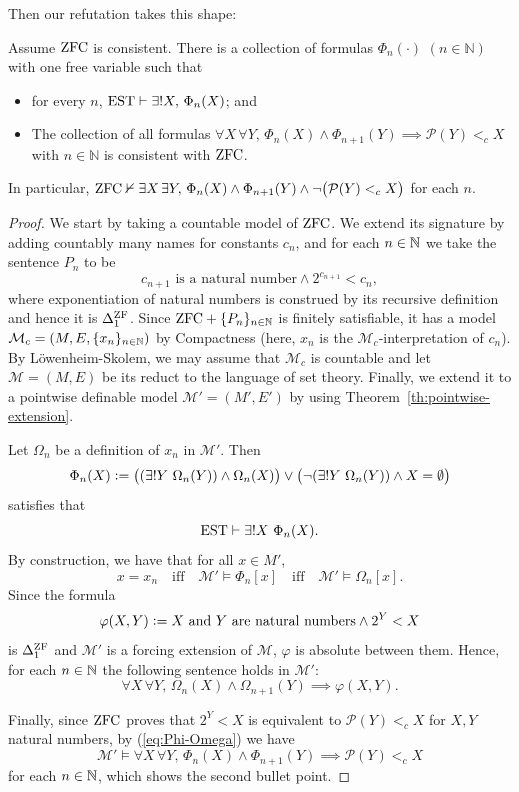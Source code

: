 Then our refutation takes this shape:
\begin{theorem}\label{th:nonuniform-exp-decreasing}
  Assume $\mathrm{ZFC}$ is consistent. There is a collection of formulas
  $\Phi_n(\cdot)$ $(n\in\mathbb{N})$ with one free variable
  such that
  \begin{itemize}
  \item  for every $n$,
    $\mathrm{EST} \vdash \exists! X, \, \Phi_n (X)$; and
  \item The collection of all formulas $\forall X\, \forall Y,\,  \Phi_n(X) \land \Phi_{n+1}(Y) \implies
    \mathcal{P}(Y) <_c X$ with $n\in\mathbb{N}$ is consistent with $\mathrm{ZFC}$.
  \end{itemize}
  In particular,  $\mathrm{ZFC} \nvdash \exists X\,\exists Y,\, \Phi_n (X) \land \Phi_{n+1} (Y)
  \land \neg\bigl(\mathcal{P}(Y) <_c X\bigl)$ for each $n$.
\end{theorem}
\begin{proof}
  We start by taking a countable model of $\mathrm{ZFC}$. 
  We extend its signature by adding countably many names for constants
  $c_n$, and for each $n\in\mathbb{N}$ we take the sentence $P_n$ to be
  \[
    c_{n+1} \text{ is a natural number} \land 2^{c_{n+1}} < c_n,
  \]
  where exponentiation of natural numbers is construed by its recursive
  definition and hence it is $\Delta^{\mathrm{ZF}}_1$.
  Since $\mathrm{ZFC}+\{P_n\}_{n\in\mathbb{N}}$ is finitely satisfiable,
  it has a model $\mathcal{M}_c =
  (M,E,\{ x_n \}_{n\in \mathbb{N}})$ by Compactness (here, $x_n$ is the
  $\mathcal{M}_c$-interpretation of $c_n$). By
  Löwenheim-Skolem, we may assume that $\mathcal{M}_c$ is countable and
  let $\mathcal{M}=(M,E)$ be its reduct to the language of set
  theory. Finally, we extend it to a pointwise definable model $\mathcal{M}'=(M',E')$
  by using Theorem~\ref{th:pointwise-extension}.
  
  Let $\Omega_n$ be a definition of $x_n$ in $\mathcal{M}'$.	
  Then 
  \[
    \Phi_n (X) \defi \bigl((\exists! Y \ \Omega_n(Y))  \land \Omega_n(X)\bigr) \lor
    \bigl(\neg(\exists! Y \ \Omega_n(Y)) \land X=\emptyset\bigr)
  \] 
  satisfies that 
  \[
    \mathrm{EST} \vdash \exists! X \ \Phi_n (X).
  \]
  By construction, we have that for all $x\in M'$,
  \begin{equation}
    \label{eq:Phi-Omega}
    x = x_n  \quad\text{iff}\quad \mathcal{M}' \models \Phi_n[x]  \quad\text{iff}\quad \mathcal{M}'
    \models \Omega_n[x].
  \end{equation}
  Since the formula
  \[
    \varphi(X,Y) \mathrel{\mathop:}= \text{$X$ and $Y$ are natural numbers} \land 2^Y < X
  \]
  is $\Delta^{\mathrm{ZF}}_1$ and $\mathcal{M}'$ is a forcing extension of $\mathcal{M}$,
  $\varphi$ is absolute between them. Hence, for each $n\in \mathbb{N}$ the
  following sentence holds in $\mathcal{M}'$:
  \[
    \forall X\, \forall Y,\,  \Omega_n(X) \land \Omega_{n+1}(Y) \implies \varphi(X,Y).
  \]

  Finally, since $\mathrm{ZFC}$ proves that $2^Y < X$ is equivalent to $\mathcal{P}(Y) <_c X$
  for $X,Y$ natural numbers, by (\ref{eq:Phi-Omega}) we have
  \[
    \mathcal{M}' \vDash \forall X\, \forall Y,\,  \Phi_n(X) \land \Phi_{n+1}(Y) \implies \mathcal{P}(Y) <_c X
  \]
  for each $n\in\mathbb{N}$, which shows the second bullet point.
\end{proof}

